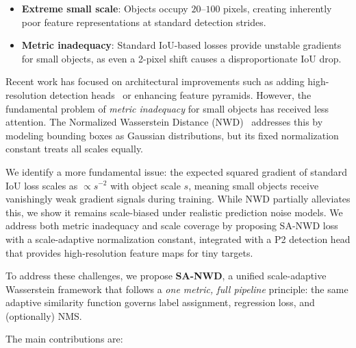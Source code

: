 \documentclass[journal]{IEEEtran}
\begin{document}
\begin{itemize}
  \item \textbf{Extreme small scale}: Objects occupy $20\text{--}100$ pixels, creating inherently poor feature representations at standard detection strides.
  \item \textbf{Metric inadequacy}: Standard IoU-based losses provide unstable gradients for small objects, as even a 2-pixel shift causes a disproportionate IoU drop.
\end{itemize}

Recent work has focused on architectural improvements such as adding high-resolution detection heads~\cite{zhu2021tph} or enhancing feature pyramids. However, the fundamental problem of \emph{metric inadequacy} for small objects has received less attention. The Normalized Wasserstein Distance (NWD)~\cite{wang2022nwd} addresses this by modeling bounding boxes as Gaussian distributions, but its fixed normalization constant treats all scales equally.

We identify a more fundamental issue: the expected squared gradient of standard IoU loss scales as $\propto s^{-2}$ with object scale $s$, meaning small objects receive vanishingly weak gradient signals during training. While NWD partially alleviates this, we show it remains scale-biased under realistic prediction noise models. We address both metric inadequacy and scale coverage by proposing SA-NWD loss with a scale-adaptive normalization constant, integrated with a P2 detection head that provides high-resolution feature maps for tiny targets.

To address these challenges, we propose \textbf{SA-NWD}, a unified scale-adaptive Wasserstein framework that follows a \emph{one metric, full pipeline} principle: the same adaptive similarity function governs label assignment, regression loss, and (optionally) NMS.

The main contributions are:
\end{document}

